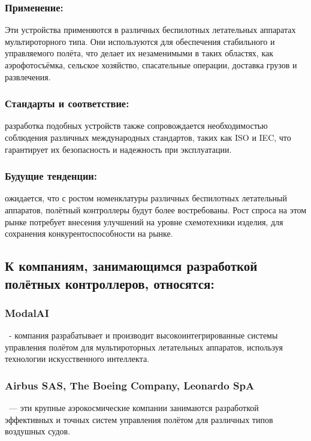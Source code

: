 \documentclass[a4paper]{bsuir-tor}
\begin{document}
  \subsubsection{Применение: }
  Эти устройства применяются в различных беспилотных летательных
  аппаратах мультироторного типа.
  Они используются для обеспечения стабильного и управляемого
  полёта, что делает их незаменимыми в таких областях, как
  аэрофотосъёмка, сельское хозяйство, спасательные операции, доставка
  грузов и развлечения.

  \subsubsection{Стандарты и соответствие: }
  разработка подобных устройств также сопровождается необходимостью
  соблюдения различных международных стандартов, таких как ISO и IEC,
  что гарантирует их безопасность и надежность при эксплуатации.
  

  
  \subsubsection{Будущие тенденции: }
  ожидается, что с ростом номенклатуры различных беспилотных
  летательный аппаратов, полётный контроллеры будут более
  востребованы. Рост спроса на этом рынке потребует внесения улучшений
  на уровне схемотехники изделия, для сохранения конкурентоспособности
  на рынке.
  

  \subsection{К компаниям,
    занимающимся разработкой полётных контроллеров, относятся:}
  \subsubsection*{ModalAI} \ - компания разрабатывает и производит
  высокоинтегрированные системы управления полётом для мультироторных
  летательных аппаратов, используя технологии искусственного интеллекта.

  \subsubsection*{Airbus SAS, The Boeing Company, Leonardo SpA}
  \ — эти крупные аэрокосмические компании занимаются разработкой
  эффективных и точных систем управления полётом для различных типов
  воздушных судов.
  
\end{document}

